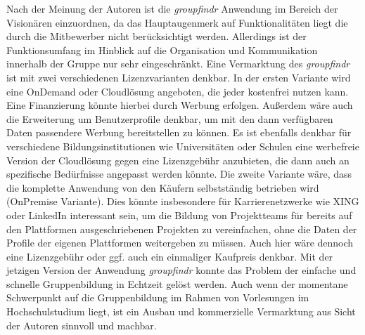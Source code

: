 Nach der Meinung der Autoren ist die \emph{groupfindr} Anwendung im Bereich der Visionären einzuordnen, da das Hauptaugenmerk auf Funktionalitäten liegt die durch die Mitbewerber nicht berücksichtigt werden. Allerdings ist der Funktionsumfang im Hinblick auf die Organisation und Kommunikation innerhalb der Gruppe nur sehr eingeschränkt.
\newline\newline
Eine Vermarktung des \emph{groupfindr} ist mit zwei verschiedenen Lizenzvarianten denkbar. In der ersten Variante wird eine OnDemand oder Cloudlösung angeboten, die jeder kostenfrei nutzen kann. Eine Finanzierung könnte hierbei durch Werbung erfolgen. Außerdem wäre auch die Erweiterung um Benutzerprofile denkbar, um mit den dann verfügbaren Daten passendere Werbung bereitstellen zu können. Es ist ebenfalls denkbar für verschiedene Bildungsinstitutionen wie Universitäten oder Schulen eine werbefreie Version der Cloudlösung gegen eine Lizenzgebühr anzubieten, die dann auch an spezifische Bedürfnisse angepasst werden könnte. Die zweite Variante wäre, dass die komplette Anwendung von den Käufern selbstständig betrieben wird (OnPremise Variante). Dies könnte insbesondere für Karrierenetzwerke wie XING oder LinkedIn interessant sein, um die Bildung von Projektteams für bereits auf den Plattformen ausgeschriebenen Projekten zu vereinfachen, ohne die Daten der Profile der eigenen Plattformen weitergeben zu müssen. Auch hier wäre dennoch eine Lizenzgebühr oder ggf. auch ein einmaliger Kaufpreis denkbar.
\newline\newline
Mit der jetzigen Version der Anwendung \emph{groupfindr} konnte das Problem der einfache und schnelle Gruppenbildung in Echtzeit gelöst werden. Auch wenn der momentane Schwerpunkt auf die Gruppenbildung im Rahmen von Vorlesungen im Hochschulstudium liegt, ist ein Ausbau und kommerzielle Vermarktung aus Sicht der Autoren sinnvoll und machbar.
